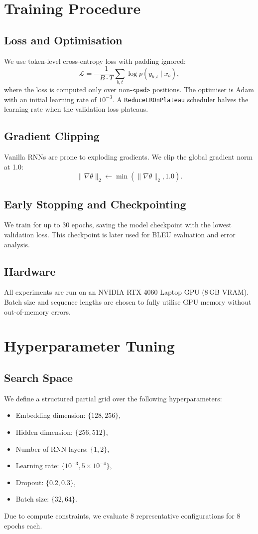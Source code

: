 \documentclass[runningheads]{llncs}
\begin{document}
\section{Training Procedure}
\subsection{Loss and Optimisation}
We use token-level cross-entropy loss with padding ignored:
\[
\mathcal{L} = -\frac{1}{B \cdot T}\sum_{b,t} \log p(y_{b,t} \mid x_b),
\]
where the loss is computed only over non-\texttt{\textless pad\textgreater} positions.
The optimiser is Adam with an initial learning rate of \(10^{-3}\).
A \texttt{ReduceLROnPlateau} scheduler halves the learning rate when the validation loss plateaus.

\subsection{Gradient Clipping}
Vanilla RNNs are prone to exploding gradients.
We clip the global gradient norm at 1.0:
\[
\|\nabla \theta\|_2 \leftarrow \min\left(\|\nabla \theta\|_2, 1.0\right).
\]

\subsection{Early Stopping and Checkpointing}
We train for up to 30 epochs, saving the model checkpoint with the lowest validation loss.
This checkpoint is later used for BLEU evaluation and error analysis.

\subsection{Hardware}
All experiments are run on an NVIDIA RTX 4060 Laptop GPU (8\,GB VRAM).
Batch size and sequence lengths are chosen to fully utilise GPU memory without out-of-memory errors.

\section{Hyperparameter Tuning}
\label{sec:hparam}
\subsection{Search Space}
We define a structured partial grid over the following hyperparameters:
\begin{itemize}
    \item Embedding dimension: \(\{128, 256\}\),
    \item Hidden dimension: \(\{256, 512\}\),
    \item Number of RNN layers: \(\{1, 2\}\),
    \item Learning rate: \(\{10^{-3}, 5\times 10^{-4}\}\),
    \item Dropout: \(\{0.2, 0.3\}\),
    \item Batch size: \(\{32, 64\}\).
\end{itemize}
Due to compute constraints, we evaluate 8 representative configurations for 8 epochs each.
\end{document}
